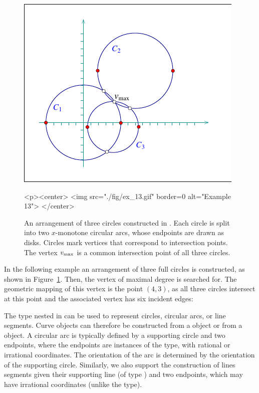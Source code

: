 \begin{figure}[t]
\begin{ccTexOnly}
  \begin{center}
  \includegraphics{Arrangement_2/fig/ex_13}
  \end{center}
\end{ccTexOnly}
\begin{ccHtmlOnly}
  <p><center>
  <img src="./fig/ex_13.gif" border=0 alt="Example 13">
  </center>
\end{ccHtmlOnly}
\caption{An arrangement of three circles constructed in
. Each circle is split into two $x$-monotone
circular arcs, whose endpoints are drawn as disks. Circles
mark vertices that correspond to intersection points. The vertex
$v_{\rm max}$ is a common intersection point of all three
circles.\label{arr_fig:ex_13}}
\end{figure}

In the following example an arrangement of three full circles is
constructed, as shown in Figure~\ref{arr_fig:ex_13}. Then, the vertex
of maximal degree is searched for. The geometric mapping of this
vertex is the point $(4,3)$, as all three circles intersect at this point
and the associated vertex has six incident edges:


The  type nested in  can be
used to represent circles, circular arcs, or line segments. Curve objects
can therefore be constructed from a  object or from
a  object. A circular arc is typically defined by
a supporting circle and two endpoints, where the endpoints are instances
of the  type, with rational or irrational coordinates. The
orientation of the arc is determined by the orientation of the supporting
circle. Similarly, we also support the construction of lines segments given
their supporting line (of type ) and two endpoints, which
may have irrational coordinates (unlike the  type).

